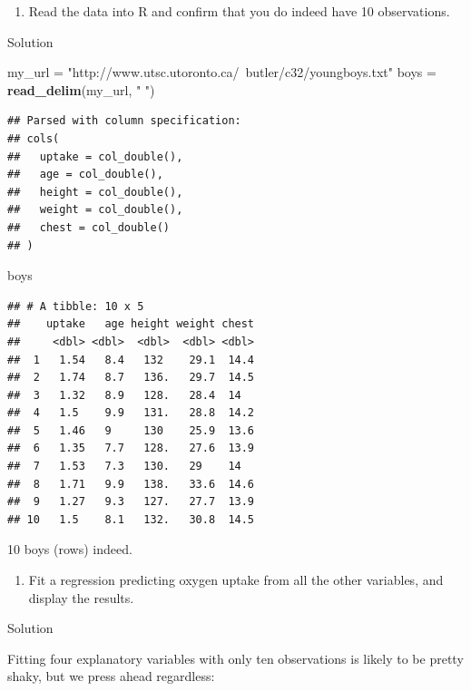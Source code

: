 \documentclass[]{tufte-book}
\newenvironment{Shaded}{}{}
\newcommand{\KeywordTok}[1]{\textcolor[rgb]{0.00,0.44,0.13}{\textbf{#1}}}
\newcommand{\NormalTok}[1]{#1}
\newcommand{\StringTok}[1]{\textcolor[rgb]{0.25,0.44,0.63}{#1}}
\providecommand{\tightlist}{%
  \setlength{\itemsep}{0pt}\setlength{\parskip}{0pt}}
\theoremstyle{definition}
\theoremstyle{definition}
\theoremstyle{definition}
\theoremstyle{remark}
\begin{document}
\begin{enumerate}
\def\labelenumi{(\alph{enumi})}
\tightlist
\item
  Read the data into R and confirm that you do indeed have 10
  observations.
\end{enumerate}

Solution

\begin{Shaded}
\begin{Highlighting}[]
\NormalTok{my_url =}\StringTok{ "http://www.utsc.utoronto.ca/~butler/c32/youngboys.txt"}
\NormalTok{boys =}\StringTok{ }\KeywordTok{read_delim}\NormalTok{(my_url, }\StringTok{" "}\NormalTok{)}
\end{Highlighting}
\end{Shaded}

\begin{verbatim}
## Parsed with column specification:
## cols(
##   uptake = col_double(),
##   age = col_double(),
##   height = col_double(),
##   weight = col_double(),
##   chest = col_double()
## )
\end{verbatim}

\begin{Shaded}
\begin{Highlighting}[]
\NormalTok{boys}
\end{Highlighting}
\end{Shaded}

\begin{verbatim}
## # A tibble: 10 x 5
##    uptake   age height weight chest
##     <dbl> <dbl>  <dbl>  <dbl> <dbl>
##  1   1.54   8.4   132    29.1  14.4
##  2   1.74   8.7   136.   29.7  14.5
##  3   1.32   8.9   128.   28.4  14  
##  4   1.5    9.9   131.   28.8  14.2
##  5   1.46   9     130    25.9  13.6
##  6   1.35   7.7   128.   27.6  13.9
##  7   1.53   7.3   130.   29    14  
##  8   1.71   9.9   138.   33.6  14.6
##  9   1.27   9.3   127.   27.7  13.9
## 10   1.5    8.1   132.   30.8  14.5
\end{verbatim}

10 boys (rows) indeed.

\begin{enumerate}
\def\labelenumi{(\alph{enumi})}
\setcounter{enumi}{1}
\tightlist
\item
  Fit a regression predicting oxygen uptake from all the other
  variables, and display the results.
\end{enumerate}

Solution

Fitting four explanatory variables with only ten observations is likely
to be pretty shaky, but we press ahead regardless:
\end{document}
